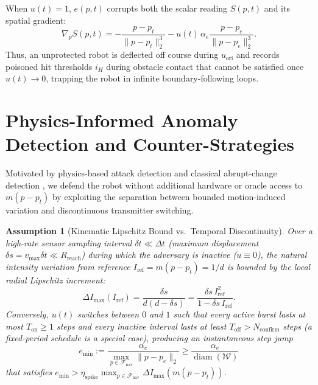 \documentclass[10pt, a4paper, twocolumn]{article}
\newtheorem{assumption}{Assumption}
\begin{document}
When $u(t) = 1$, $e(p, t)$ corrupts both the scalar reading $S(p, t)$ and its spatial gradient:
\begin{equation}
    \nabla_p S(p, t) = -\frac{p - p_t}{\|p - p_t\|_2^3} - u(t)\,\alpha_e \frac{p - p_e}{\|p - p_e\|_2^3}.
    \label{eq:corrupted_grad}
\end{equation}
Thus, an unprotected robot is deflected off course during $u_{\text{ori}}$ and records poisoned hit thresholds $i_H$ during obstacle contact that cannot be satisfied once $u(t) \to 0$, trapping the robot in infinite boundary-following loops.

\section{Physics-Informed Anomaly Detection and Counter-Strategies}

Motivated by physics-based attack detection \cite{giraldo2018survey} and classical abrupt-change detection \cite{basseville1993detection}, we defend the robot without additional hardware or oracle access to $m(p - p_t)$ by exploiting the separation between bounded motion-induced variation and discontinuous transmitter switching.

\begin{assumption}[Kinematic Lipschitz Bound vs.\ Temporal Discontinuity]
\label{assump:discontinuity}
Over a high-rate sensor sampling interval $\delta t \ll \Delta t$ (maximum displacement $\delta s = v_{\max}\delta t \ll R_{\text{reach}}$) during which the adversary is inactive ($u \equiv 0$), the natural intensity variation from reference $I_{\text{ref}} = m(p - p_t) = 1/d$ is bounded by the local radial Lipschitz increment:
\begin{equation}
    \Delta I_{\max}(I_{\text{ref}}) = \frac{\delta s}{d(d - \delta s)} = \frac{\delta s\, I_{\text{ref}}^2}{1 - \delta s\, I_{\text{ref}}}.
    \label{eq:lipschitz}
\end{equation}
Conversely, $u(t)$ switches between $0$ and $1$ such that every active burst lasts at most $T_{\text{on}} \ge 1$ steps and every inactive interval lasts at least $T_{\text{off}} > N_{\text{confirm}}$ steps (a fixed-period schedule is a special case), producing an instantaneous step jump
\begin{equation}
    e_{\min} := \frac{\alpha_e}{\max_{p \in \mathcal{F}_{\text{nav}}} \|p - p_e\|_2} \ge \frac{\alpha_e}{\operatorname{diam}(\mathcal{W})}
    \label{eq:emin_short}
\end{equation}
that satisfies $e_{\min} > \eta_{\text{spike}} \max_{p \in \mathcal{F}_{\text{nav}}} \Delta I_{\max}(m(p-p_t))$.
\end{assumption}
\end{document}
